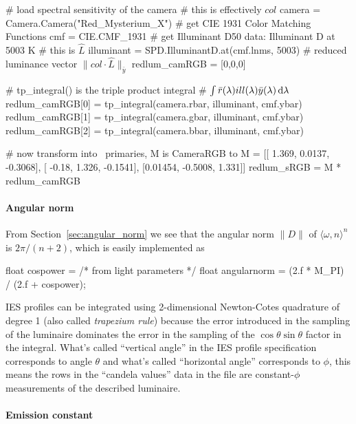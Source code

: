 \begin{pythoncode}
# load spectral sensitivity of the camera
# this is effectively $col$
camera = Camera.Camera("Red_Mysterium_X")
# get CIE 1931 Color Matching Functions
cmf = CIE.CMF_1931
# get Illuminant D50 data: Illuminant D at 5003 K
# this is $\hat{L}$
illuminant = SPD.IlluminantD.at(cmf.lnms, 5003)
# reduced luminance vector $\|col\cdot \hat{L}\|_{\bar{y}}$
redlum_camRGB = [0,0,0]

# tp\_integral() is the triple product integral
# $\int \bar{r}(\lambda) ill(\lambda) \bar{y}(\lambda) \mathop{}\!\mathrm{d}\lambda$
redlum_camRGB[0] = tp_integral(camera.rbar, illuminant, cmf.ybar)
redlum_camRGB[1] = tp_integral(camera.gbar, illuminant, cmf.ybar)
redlum_camRGB[2] = tp_integral(camera.bbar, illuminant, cmf.ybar)

# now transform into \sRGBl\ primaries, M is CameraRGB to \sRGBl
M = [[  1.369,  0.0137, -0.3068],
 [  -0.18,   1.326, -0.1541],
 [0.01454, -0.5008,   1.331]]
redlum_sRGB = M * redlum_camRGB

\end{pythoncode}


\paragraph{Angular norm}

From Section~\ref{sec:angular_norm} we see that the angular norm $\|D\|$ of
$\langle \omega, \hat n \rangle^n$ is $2\pi / (n+2)$, which is easily
implemented as

\begin{c++code}
float cospower = /* from light parameters */
float angularnorm = (2.f * M_PI) / (2.f + cospower);
\end{c++code}

\Gls{IES} profiles can be integrated using 2-dimensional Newton-Cotes quadrature
of degree 1 (also called \textsl{trapezium rule}) because the error introduced
in the sampling of the luminaire dominates the error in the sampling of the
$\cos\theta\sin\theta$ factor in the integral. What's called ``vertical angle''
in the \gls{IES} profile specification corresponds to angle $\theta$ and what's
called ``horizontal angle'' corresponds to $\phi$, this means the rows in the
``candela values'' data in the file are constant-$\phi$ measurements of the
described luminaire.

\paragraph{Emission constant}

